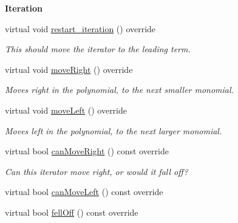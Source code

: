 \begin{Indent}\textbf{ Iteration}\par
\begin{DoxyCompactItemize}
\item 
\mbox{\label{group___iterator_group_a2acbad922f8fdd33300e49979773ba00}} 
virtual void \hyperlink{group___iterator_group_a2acbad922f8fdd33300e49979773ba00}{restart\+\_\+iteration} () override
\begin{DoxyCompactList}\small\item\em This should move the iterator to the leading term. \end{DoxyCompactList}\item 
\mbox{\label{group___iterator_group_a1124336f77c6d4dffdc6d3da4d6078ed}} 
virtual void \hyperlink{group___iterator_group_a1124336f77c6d4dffdc6d3da4d6078ed}{move\+Right} () override
\begin{DoxyCompactList}\small\item\em Moves right in the polynomial, to the next smaller monomial. \end{DoxyCompactList}\item 
\mbox{\label{group___iterator_group_ae94baa36d6b096c1144068dc21108c23}} 
virtual void \hyperlink{group___iterator_group_ae94baa36d6b096c1144068dc21108c23}{move\+Left} () override
\begin{DoxyCompactList}\small\item\em Moves left in the polynomial, to the next larger monomial. \end{DoxyCompactList}\item 
\mbox{\label{group___iterator_group_ad24c1412a9027a2d02faf946c8471985}} 
virtual bool \hyperlink{group___iterator_group_ad24c1412a9027a2d02faf946c8471985}{can\+Move\+Right} () const override
\begin{DoxyCompactList}\small\item\em Can this iterator move right, or would it fall off? \end{DoxyCompactList}\item 
virtual bool \hyperlink{group___iterator_group_a6c3db5961d5faf1b465c51e8935e0b89}{can\+Move\+Left} () const override
\item 
virtual bool \hyperlink{group___iterator_group_a44ac71c5f71fc2830c74c4d289c9aec8}{fell\+Off} () const override
\end{DoxyCompactItemize}
\end{Indent}
